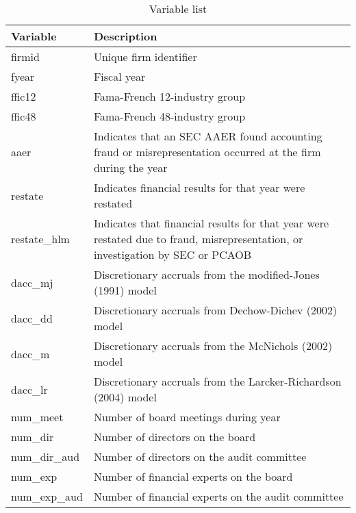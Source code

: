 \documentclass[11pt]{amsart}
\theoremstyle{definition}
\theoremstyle{question}
\begin{document}
\begin{table}[h]
\caption{Variable list} \label{tab:vars}
	\begin{tabular}{ll}
\textbf{	Variable} & \textbf{Description }\\
	\hline
		firmid & Unique firm identifier \\
		fyear	 &	Fiscal year \\
		ffic12	 &Fama-French 12-industry group  \\
		ffic48 &	Fama-French 48-industry group \\
		aaer 	&	Indicates that an SEC AAER found accounting fraud or 	misrepresentation occurred at the firm during the year \\
		restate	&	Indicates financial results for that year were restated \\
		restate\_hlm	& Indicates that financial results for that year were restated due to fraud, 	misrepresentation, or investigation by SEC or PCAOB \\
		dacc\_mj & Discretionary accruals from the modified-Jones (1991) model \\
		dacc\_dd  &	Discretionary accruals from Dechow-Dichev (2002) model \\
		dacc\_m & Discretionary accruals from the McNichols (2002) model \\
		dacc\_lr &	Discretionary accruals from the Larcker-Richardson (2004) model \\
		num\_meet	& Number of board meetings during year \\
		num\_dir & 	Number of directors on the board \\
		num\_dir\_aud & Number of directors on the audit committee \\
		num\_exp  & Number of financial experts on the board \\
		num\_exp\_aud & 	Number of financial experts on the audit committee \\
\end{tabular}	
\end{table}


\end{document}
